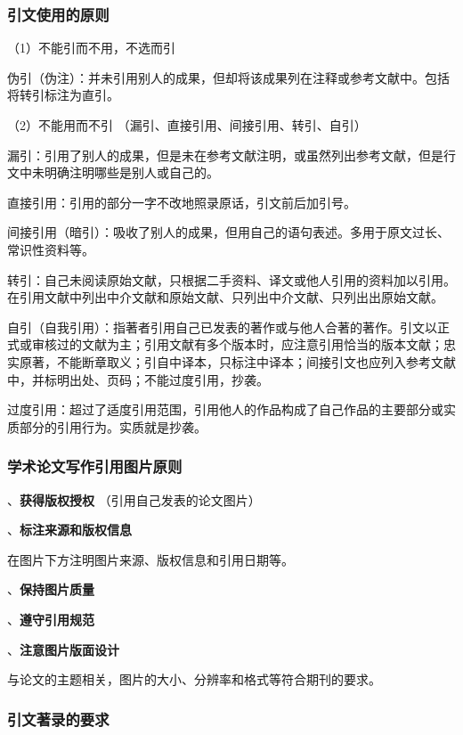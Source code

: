 \documentclass[12pt,hyperref,a4paper,UTF8]{ctexart}
\begin{document}
\subsubsection{引文使用的原则}
（1）不能引而不用，不选而引

伪引（伪注）：并未引用别人的成果，但却将该成果列在注释或参考文献中。包括将转引标注为直引。

（2）不能用而不引 （漏引、直接引用、间接引用、转引、自引）

漏引：引用了别人的成果，但是未在参考文献注明，或虽然列出参考文献，但是行文中未明确注明哪些是别人或自己的。

直接引用：引用的部分一字不改地照录原话，引文前后加引号。

间接引用（暗引）：吸收了别人的成果，但用自己的语句表述。多用于原文过长、常识性资料等。

转引：自己未阅读原始文献，只根据二手资料、译文或他人引用的资料加以引用。在引用文献中列出中介文献和原始文献、只列出中介文献、只列出出原始文献。

自引（自我引用）：指著者引用自己已发表的著作或与他人合著的著作。引文以正式或审核过的文献为主；引用文献有多个版本时，应注意引用恰当的版本文献；忠实原著，不能断章取义；引自中译本，只标注中译本；间接引文也应列入参考文献中，并标明出处、页码；不能过度引用，抄袭。

过度引用：超过了适度引用范围，引用他人的作品构成了自己作品的主要部分或实质部分的引用行为。实质就是抄袭。

\subsubsection{学术论文写作引用图片原则}
、\textbf{获得版权授权}
（引用自己发表的论文图片）

、\textbf{标注来源和版权信息}

在图片下方注明图片来源、版权信息和引用日期等。

、\textbf{保持图片质量}

、\textbf{遵守引用规范}

、\textbf{注意图片版面设计}

与论文的主题相关，图片的大小、分辨率和格式等符合期刊的要求。

\subsubsection{引文著录的要求}
\end{document}
